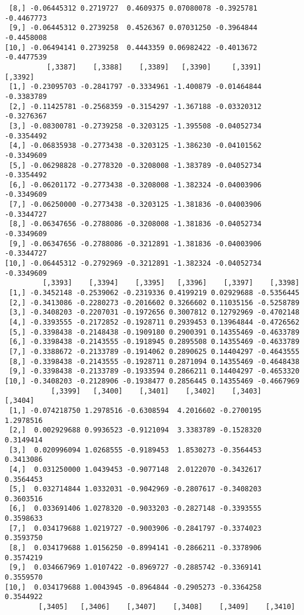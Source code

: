 \documentclass[
  letterpaper,
  DIV=11,
  numbers=noendperiod]{scrreprt}
\begin{document}
\begin{verbatim}
 [8,] -0.06445312 0.2719727  0.4609375 0.07080078 -0.3925781 -0.4467773
 [9,] -0.06445312 0.2739258  0.4526367 0.07031250 -0.3964844 -0.4458008
[10,] -0.06494141 0.2739258  0.4443359 0.06982422 -0.4013672 -0.4477539
          [,3387]    [,3388]    [,3389]   [,3390]     [,3391]    [,3392]
 [1,] -0.23095703 -0.2841797 -0.3334961 -1.400879 -0.01464844 -0.3383789
 [2,] -0.11425781 -0.2568359 -0.3154297 -1.367188 -0.03320312 -0.3276367
 [3,] -0.08300781 -0.2739258 -0.3203125 -1.395508 -0.04052734 -0.3354492
 [4,] -0.06835938 -0.2773438 -0.3203125 -1.386230 -0.04101562 -0.3349609
 [5,] -0.06298828 -0.2778320 -0.3208008 -1.383789 -0.04052734 -0.3354492
 [6,] -0.06201172 -0.2773438 -0.3208008 -1.382324 -0.04003906 -0.3349609
 [7,] -0.06250000 -0.2773438 -0.3203125 -1.381836 -0.04003906 -0.3344727
 [8,] -0.06347656 -0.2788086 -0.3208008 -1.381836 -0.04052734 -0.3349609
 [9,] -0.06347656 -0.2788086 -0.3212891 -1.381836 -0.04003906 -0.3344727
[10,] -0.06445312 -0.2792969 -0.3212891 -1.382324 -0.04052734 -0.3349609
         [,3393]    [,3394]    [,3395]   [,3396]    [,3397]    [,3398]
 [1,] -0.3452148 -0.2539062 -0.2319336 0.4199219 0.02929688 -0.5356445
 [2,] -0.3413086 -0.2280273 -0.2016602 0.3266602 0.11035156 -0.5258789
 [3,] -0.3408203 -0.2207031 -0.1972656 0.3007812 0.12792969 -0.4702148
 [4,] -0.3393555 -0.2172852 -0.1928711 0.2939453 0.13964844 -0.4726562
 [5,] -0.3398438 -0.2148438 -0.1909180 0.2900391 0.14355469 -0.4633789
 [6,] -0.3398438 -0.2143555 -0.1918945 0.2895508 0.14355469 -0.4633789
 [7,] -0.3388672 -0.2133789 -0.1914062 0.2890625 0.14404297 -0.4643555
 [8,] -0.3398438 -0.2143555 -0.1928711 0.2871094 0.14355469 -0.4648438
 [9,] -0.3398438 -0.2133789 -0.1933594 0.2866211 0.14404297 -0.4653320
[10,] -0.3408203 -0.2128906 -0.1938477 0.2856445 0.14355469 -0.4667969
           [,3399]   [,3400]    [,3401]    [,3402]    [,3403]   [,3404]
 [1,] -0.074218750 1.2978516 -0.6308594  4.2016602 -0.2700195 1.2978516
 [2,]  0.002929688 0.9936523 -0.9121094  3.3383789 -0.1528320 0.3149414
 [3,]  0.020996094 1.0268555 -0.9189453  1.8530273 -0.3564453 0.3413086
 [4,]  0.031250000 1.0439453 -0.9077148  2.0122070 -0.3432617 0.3564453
 [5,]  0.032714844 1.0332031 -0.9042969 -0.2807617 -0.3408203 0.3603516
 [6,]  0.033691406 1.0278320 -0.9033203 -0.2827148 -0.3393555 0.3598633
 [7,]  0.034179688 1.0219727 -0.9003906 -0.2841797 -0.3374023 0.3593750
 [8,]  0.034179688 1.0156250 -0.8994141 -0.2866211 -0.3378906 0.3574219
 [9,]  0.034667969 1.0107422 -0.8969727 -0.2885742 -0.3369141 0.3559570
[10,]  0.034179688 1.0043945 -0.8964844 -0.2905273 -0.3364258 0.3544922
        [,3405]   [,3406]    [,3407]    [,3408]    [,3409]    [,3410]

\end{verbatim}
\end{document}
